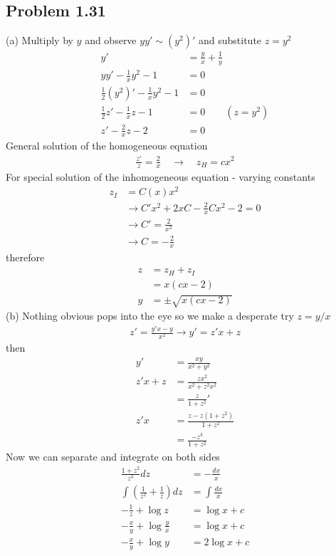 \documentclass[../main.tex]{subfiles}
\begin{document}
\subsection{Problem 1.31}
(a) Multiply by $y$ and observe $yy'\sim(y^2)'$ and substitute $z=y^2$
\begin{align}
y'&=\frac{y}{x}+\frac{1}{y}\\
yy'-\frac{1}{x}y^2-1&=0\\
\frac{1}{2}(y^2)'-\frac{1}{x}y^2-1&=0\\
\frac{1}{2}z'-\frac{1}{x}z-1&=0\qquad(z=y^2)\\
z'-\frac{2}{x}z-2&=0
\end{align}
General solution of the homogeneous equation
\begin{align}
\frac{z'}{z}=\frac{2}{x}\quad\rightarrow\quad z_H=cx^2
\end{align}
For special solution of the inhomogeneous equation - varying constants
\begin{align}
z_I&=C(x)x^2\\
&\rightarrow C'x^2+2xC-\frac{2}{x}Cx^2-2=0\\
&\rightarrow C'=\frac{2}{x^2}\\
&\rightarrow C=-\frac{2}{x}
\end{align}
therefore
\begin{align}
z&=z_H+z_I\\
&=x(cx-2)\\
y&=\pm\sqrt{x(cx-2)}
\end{align}
(b) Nothing obvious pops into the eye so we make a desperate try $z=y/x$
\begin{align}
z'=\frac{y'x-y}{x^2}\rightarrow y'=z'x+z
\end{align}
then
\begin{align}
y'&=\frac{xy}{x^2+y^2}\\
z'x+z
&=\frac{zx^2}{x^2+z^2x^2}\\
&=\frac{z}{1+z^2}'\\
z'x&=\frac{z-z(1+z^2)}{1+z^2}\\
&=\frac{-z^3}{1+z^2}
\end{align}
Now we can separate and integrate on both sides
\begin{align}
\frac{1+z^2}{z^3}dz&=-\frac{dx}{x}\\
\int\left(\frac{1}{z^2}+\frac{1}{z}\right)dz&=\int\frac{dx}{x}\\
-\frac{1}{z}+\log z&=\log{x}+c\\
-\frac{x}{y}+\log\frac{y}{x}&=\log{x}+c\\
-\frac{x}{y}+\log y&=2\log{x}+c
\end{align}
\end{document}
